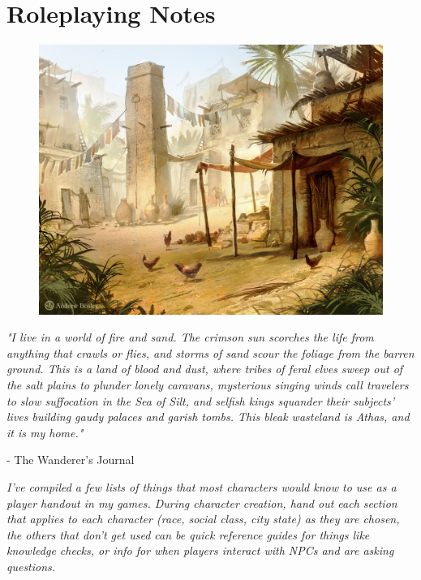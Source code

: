 \chapter{Roleplaying Notes}\label{chap:roleplaying}

\begin{figure}[!htb]
\centering
\includegraphics[width=0.7\linewidth]{images/village.jpg}
\end{figure}

\epigraph{\textit{
"I live in a world of fire and sand. The crimson sun scorches the life from
 anything that crawls or flies, and storms of sand scour the foliage from
 the barren ground. This is a land of blood and dust, where tribes of feral
 elves sweep out of the salt plains to plunder lonely caravans, mysterious
 singing winds call travelers to slow suffocation in the Sea of Silt, and
 selfish kings squander their subjects’ lives building gaudy palaces and
 garish tombs. This bleak wasteland is Athas, and it is my home." } } { - The Wanderer’s Journal }

\textit{I've compiled a few lists of things that most characters would know to use as a player handout in my games.
During character creation, hand out each section that applies to each character (race, social class, city state)
as they are chosen, the others that don't get used can be quick reference guides for things like knowledge checks,
or info for when players interact with NPCs and are asking questions.}

